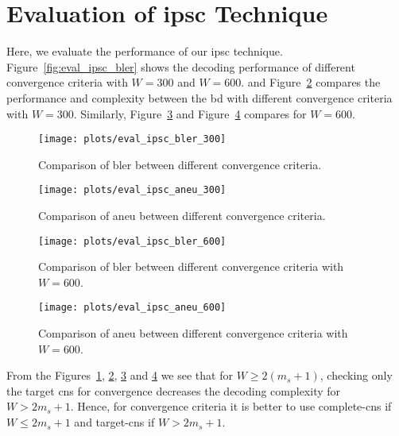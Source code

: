\section{Evaluation of \texorpdfstring{\acrlong{ipsc}}{IPSC} Technique}
Here, we evaluate the performance of our \gls{ipsc} technique. Figure~\ref{fig:eval_ipsc_bler} shows the decoding performance of different convergence criteria with $W=300$ and $W=600$. and Figure~\ref{fig:eval_ipsc_aneu_300} compares the performance and complexity between the \gls{bd} with different convergence criteria with $W=300$. Similarly, Figure~\ref{fig:eval_ipsc_bler_600} and Figure~\ref{fig:eval_ipsc_aneu_600} compares for $W=600$.
\begin{figure}[htbp]
  \centering
  \texttt{[image: plots/eval\_ipsc\_bler\_300]}
  \caption[Comparison of \acrshort{bler} between different convergence criteria for $W=300$.]{Comparison of \gls{bler} between different convergence criteria.}
  \label{fig:eval_ipsc_bler_300}
\end{figure}
\begin{figure}[htbp]
  \centering
  \texttt{[image: plots/eval\_ipsc\_aneu\_300]}
  \caption[Comparison of \acrshort{aneu} between different convergence criteria for $W=300$.]{Comparison of \gls{aneu} between different convergence criteria.}
  \label{fig:eval_ipsc_aneu_300}
\end{figure}
\begin{figure}[htbp]
  \centering
  \texttt{[image: plots/eval\_ipsc\_bler\_600]}
  \caption[Comparison of \acrshort{bler} between different convergence criteria for $W=600$.]{Comparison of \gls{bler} between different convergence criteria with $W=600$.}
  \label{fig:eval_ipsc_bler_600}
\end{figure}
\begin{figure}[htbp]
  \centering
  \texttt{[image: plots/eval\_ipsc\_aneu\_600]}
  \caption[Comparison of \acrshort{aneu} between different convergence criteria for $W=600$.]{Comparison of \gls{aneu} between different convergence criteria with $W=600$.}
  \label{fig:eval_ipsc_aneu_600}
\end{figure}

From the Figures~\ref{fig:eval_ipsc_bler_300}, \ref{fig:eval_ipsc_aneu_300}, \ref{fig:eval_ipsc_bler_600} and \ref{fig:eval_ipsc_aneu_600} we see that for $W\geq2(m_s+1)$, checking only the target \glspl{cn} for convergence decreases the decoding complexity for $W>2m_s+1$. Hence, for convergence criteria it is better to use complete-\glspl{cn} if $W\leq2m_s+1$ and target-\glspl{cn} if $W>2m_s+1$.